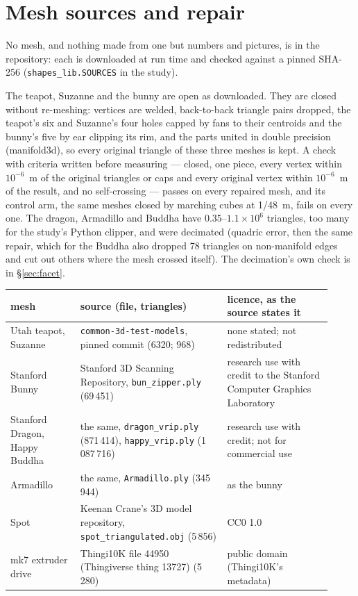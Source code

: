\documentclass[10pt,a4paper]{article}
\begin{document}
\section{Mesh sources and repair}\label{app:meshes}
No mesh, and nothing made from one but numbers and pictures, is in the repository: each is downloaded
at run time and checked against a pinned SHA-256 (\texttt{shapes\_lib.SOURCES} in the study).

The teapot, Suzanne and the bunny are open as downloaded.
They are closed without re-meshing: vertices are welded, back-to-back triangle pairs dropped, the
teapot's six and Suzanne's four holes capped by fans to their centroids and the bunny's five by ear
clipping its rim, and the parts united in double precision (manifold3d), so every original triangle of
these three meshes is kept. A check with criteria written before measuring --- closed, one piece,
every vertex within $10^{-6}$~m of the original triangles or caps and every original vertex within
$10^{-6}$~m of the result, and no self-crossing --- passes on every repaired mesh, and its control arm,
the same meshes closed by marching cubes at 1/48~m, fails on every one. The dragon, Armadillo and
Buddha have $0.35$--$1.1\times10^{6}$ triangles, too many for the study's Python clipper, and were
decimated (quadric error, then the same repair, which for the Buddha also dropped 78 triangles on
non-manifold edges and cut out others where the mesh crossed itself). The decimation's own check is in \S\ref{sec:facet}.

\begin{center}\scriptsize
\begin{tabular}{>{\raggedright}p{0.2\linewidth}>{\raggedright}p{0.42\linewidth}>{\raggedright\arraybackslash}p{0.3\linewidth}}\toprule
mesh & source (file, triangles) & licence, as the source states it\\\midrule
Utah teapot, Suzanne & \texttt{common-3d-test-models}, pinned commit (6320; 968) & none stated; not
redistributed\\
Stanford Bunny & Stanford 3D Scanning Repository, \texttt{bun\_zipper.ply} (69\,451)
\citep{turk1994} & research use with credit to the Stanford Computer Graphics Laboratory\\
Stanford Dragon, Happy Buddha & the same, \texttt{dragon\_vrip.ply} (871\,414), \texttt{happy\_vrip.ply}
(1\,087\,716) \citep{curless1996} & research use with credit; not for commercial use\\
Armadillo & the same, \texttt{Armadillo.ply} (345\,944) \citep{krishnamurthy1996} & as the bunny\\
Spot & Keenan Crane's 3D model repository, \texttt{spot\_triangulated.obj} (5\,856)
\citep{crane2013} & CC0 1.0\\
mk7 extruder drive & Thingi10K file 44950 (Thingiverse thing 13727) \citep{zhou2016} (5\,280) &
public domain (Thingi10K's metadata)\\\bottomrule
\end{tabular}
\end{center}
\end{document}
